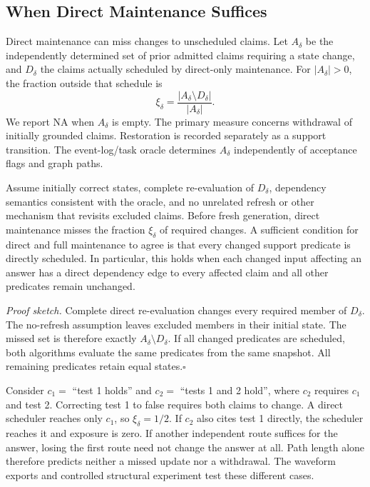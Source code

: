 \subsection{When Direct Maintenance Suffices}

Direct maintenance can miss changes to unscheduled claims.
Let $A_\delta$ be the independently determined set of prior admitted claims
requiring a state change, and $D_\delta$ the claims actually scheduled by direct-only
maintenance. For $|A_\delta|>0$, the fraction outside that schedule is
\begin{equation}
 \xi_\delta=\frac{|A_\delta\setminus D_\delta|}{|A_\delta|}.
 \label{eq:exposure}
\end{equation}
We report NA when $A_\delta$ is empty. The primary measure concerns withdrawal
of initially grounded claims. Restoration is recorded separately as a support
transition. The event-log/task oracle determines $A_\delta$ independently of
acceptance flags and graph paths.

\begin{proposition}
Assume initially correct states, complete re-evaluation of $D_\delta$, dependency
semantics consistent with the oracle, and no unrelated refresh or other mechanism
that revisits excluded claims. Before fresh generation, direct maintenance misses
the fraction $\xi_\delta$ of required changes. A sufficient condition for direct
and full maintenance to agree is that every changed support predicate is directly
scheduled. In particular, this holds when each changed input affecting an answer
has a direct dependency edge to every affected claim and all other predicates
remain unchanged.
\end{proposition}
\noindent\emph{Proof sketch.}
Complete direct re-evaluation changes every required member of $D_\delta$.
The no-refresh assumption leaves excluded members in their initial state.
The missed set is therefore exactly $A_\delta\setminus D_\delta$.
If all changed predicates are scheduled, both algorithms evaluate the same
predicates from the same snapshot. All remaining predicates retain equal
states.\hfill$\square$

Consider $c_1=$ ``test 1 holds'' and $c_2=$ ``tests 1 and 2 hold'', where $c_2$
requires $c_1$ and test 2. Correcting test 1 to false requires both claims to
change. A direct scheduler reaches only $c_1$, so $\xi_\delta=1/2$.
If $c_2$ also cites test 1 directly, the scheduler reaches it and exposure is zero.
If another independent route suffices for the answer, losing the first route
need not change the answer at all. Path length alone therefore predicts neither
a missed update nor a withdrawal. The waveform exports and controlled structural
experiment test these different cases.
